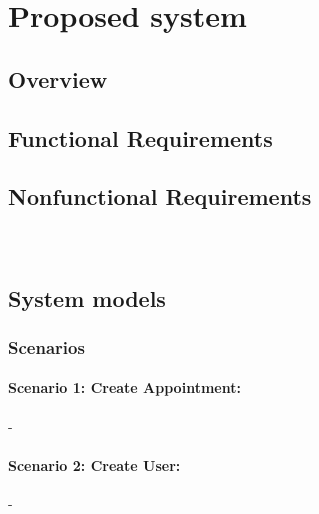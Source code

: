 \section{Proposed system}
	\subsection{Overview}
	\subsection{Functional Requirements}
	\subsection{Nonfunctional Requirements}				%
		\subsubsection*{}
		\\
	\subsection{System models}							%
		\subsubsection{Scenarios}
			\paragraph{Scenario 1: Create Appointment:}
			 -\\

			\paragraph{Scenario 2: Create User:}
			 -\\
			
